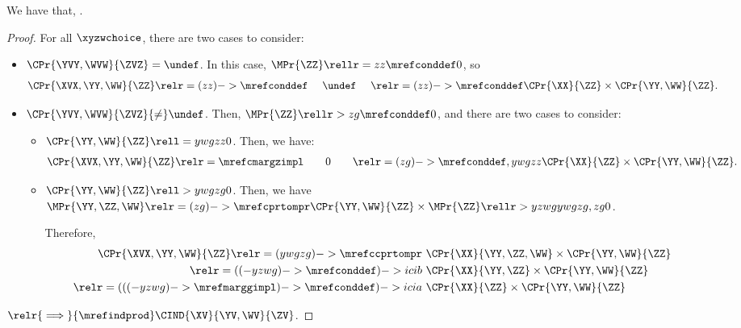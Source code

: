 \begin{proposition}
  We have that, \indcontrdefa.%
\end{proposition}

\begin{proof}
  For all $\xyzwchoice$, there are two cases to consider:
  \begin{itemize}
    \item {} $\CPr{\YVY, \WVW}{\ZVZ} = \undef$. In this case, $\MPr{\ZZ} \rellr = zz {\mrefconddef} 0$, so
      \begin{align*}
        \CPr{\XVX, \YY, \WW}{\ZZ} \relr = {(zz)->\mrefconddef} \ \ \ \ \undef\ \ \ \  
        \relr = {(zz)->\mrefconddef} \CPr{\XX}{\ZZ}\times \CPr{\YY, \WW}{\ZZ}.
      \end{align*}
    \item {} $\CPr{\YVY, \WVW}{\ZVZ} {\ne} \undef$. Then, $\MPr{\ZZ} \rellr > zg {\mrefconddef} 0$, and there are two cases to consider:
      \begin{itemize}
        \item {} $\CPr{\YY, \WW}{\ZZ} \rell = ywgzz 0$. Then, we have:
        \begin{align*}
          \CPr{\XVX, \YY, \WW}{\ZZ} \relr = {\mrefcmargzimpl} \ \ \ \ \ \ 0 \ \ \ \ \ \ 
          \relr = {(zg)->\mrefconddef,ywgzz} \CPr{\XX}{\ZZ}\times \CPr{\YY, \WW}{\ZZ}.
        \end{align*}
      \item \nrp 6 $\CPr{\YY, \WW}{\ZZ} \rell > ywgzg 0$.
        Then, we have $\MPr{\YY, \ZZ, \WW}  \relr = {(zg)->\mrefcprtompr} \CPr{\YY, \WW}{\ZZ} \times \MPr{\ZZ} \rellr > yzwg {ywgzg,zg} 0$.

        \nrp 7
        Therefore,
        \begin{align*}
          \CPr{\XVX, \YY, \WW}{\ZZ} \relr = {(ywgzg)->\mrefccprtompr} &\ \CPr{\XX}{\YY, \ZZ, \WW} \times \CPr{\YY, \WW}{\ZZ}\\
          \relr = {((-yzwg)->\mrefconddef)->icib} &\ \CPr{\XX}{\YY, \ZZ} \times \CPr{\YY, \WW}{\ZZ}\\
          \relr = {(((-yzwg)->\mrefmarggimpl)->\mrefconddef)->icia} &\ \CPr{\XX}{\ZZ} \times \CPr{\YY, \WW}{\ZZ}
        \end{align*}
      \end{itemize}
  \end{itemize}
  $\relr {\implies} {\mrefindprod} \CIND{\XV}{\YV, \WV}{\ZV}$.
\end{proof}

